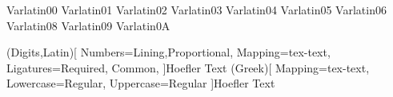 


\newcommand{\chapterendsymbol}{%
    \par
    \begin{center}\adforn{60}\end{center}
    }
\newcommand{\chapterend}{\chapterendsymbol}

\DeclareFlexSymbol{\Gamma}  {Var}{latin}{00}
\DeclareFlexSymbol{\Delta}  {Var}{latin}{01}
\DeclareFlexSymbol{\Theta}  {Var}{latin}{02}
\DeclareFlexSymbol{\Lambda} {Var}{latin}{03}
\DeclareFlexSymbol{\Xi}     {Var}{latin}{04}
\DeclareFlexSymbol{\Pi}     {Var}{latin}{05}
\DeclareFlexSymbol{\Sigma}  {Var}{latin}{06}
\DeclareFlexSymbol{\Phi}    {Var}{latin}{08}
\DeclareFlexSymbol{\Psi}    {Var}{latin}{09}
\DeclareFlexSymbol{\Omega}  {Var}{latin}{0A}




\usepackage{acro}

\usepackage[quiet]{mathspec}
\usepackage{xltxtra} %
\setmathfont(Digits,Latin)[
    Numbers={Lining,Proportional},
    Mapping=tex-text,
    Ligatures={Required, Common},
]{Hoefler Text}
\setmathfont(Greek)[
    Mapping=tex-text,
    Lowercase=Regular,
    Uppercase=Regular
]{Hoefler Text}
\setmainfont[
    Mapping=tex-text,
    Ligatures={Required, Common}
]{Hoefler Text}
